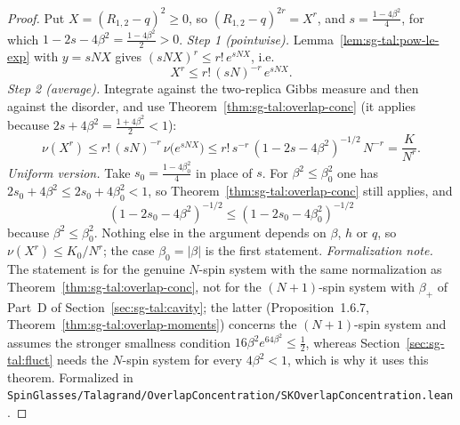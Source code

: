 \begin{proof}
  \leanok
Put $X=(R_{1,2}-q)^2\ge0$, so $(R_{1,2}-q)^{2r}=X^r$, and $s=\frac{1-4\beta^2}4$, for which $1-2s-4\beta^2=\frac{1-4\beta^2}2>0$.
\emph{Step 1 (pointwise).} Lemma~\ref{lem:sg-tal:pow-le-exp} with $y=sNX$ gives $(sNX)^r\le r!\,e^{sNX}$, i.e.
\[
X^r\le r!\,(sN)^{-r}\,e^{sNX}.
\]
\emph{Step 2 (average).} Integrate against the two-replica Gibbs measure and then against the disorder, and use Theorem~\ref{thm:sg-tal:overlap-conc} (it applies because $2s+4\beta^2=\frac{1+4\beta^2}2<1$):
\[
\nu(X^r)\le r!\,(sN)^{-r}\,\nu\big(e^{sNX}\big)\le r!\,s^{-r}\,(1-2s-4\beta^2)^{-1/2}\,N^{-r}=\frac K{N^{r}} .
\]
\emph{Uniform version.} Take $s_0=\frac{1-4\beta_0^2}4$ in place of $s$. For $\beta^2\le\beta_0^2$ one has $2s_0+4\beta^2\le2s_0+4\beta_0^2<1$, so Theorem~\ref{thm:sg-tal:overlap-conc} still applies, and
\[
(1-2s_0-4\beta^2)^{-1/2}\le(1-2s_0-4\beta_0^2)^{-1/2}
\]
because $\beta^2\le\beta_0^2$. Nothing else in the argument depends on $\beta$, $h$ or $q$, so $\nu(X^r)\le K_0/N^r$; the case $\beta_0=|\beta|$ is the first statement.
\emph{Formalization note.} The statement is for the genuine $N$-spin system with the same normalization as Theorem~\ref{thm:sg-tal:overlap-conc}, not for the $(N+1)$-spin system with $\beta_+$ of Part~D of Section~\ref{sec:sg-tal:cavity}; the latter (Proposition~1.6.7, Theorem~\ref{thm:sg-tal:overlap-moments}) concerns the $(N+1)$-spin system and assumes the stronger smallness condition $16\beta^2e^{64\beta^2}\le\tfrac12$, whereas Section~\ref{sec:sg-tal:fluct} needs the $N$-spin system for every $4\beta^2<1$, which is why it uses this theorem.
Formalized in \texttt{SpinGlasses/Talagrand/OverlapConcentration/SKOverlapConcentration.lean}.
\end{proof}

